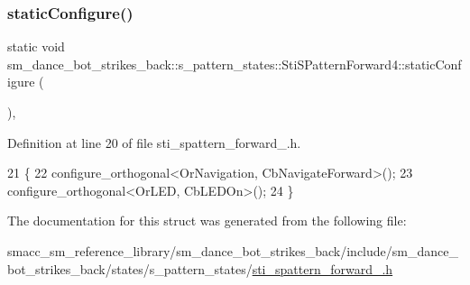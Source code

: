 \subsubsection{\texorpdfstring{static\+Configure()}{staticConfigure()}}
{\footnotesize\ttfamily static void sm\+\_\+dance\+\_\+bot\+\_\+strikes\+\_\+back\+::s\+\_\+pattern\+\_\+states\+::\+Sti\+S\+Pattern\+Forward4\+::static\+Configure (\begin{DoxyParamCaption}{ }\end{DoxyParamCaption})\hspace{0.3cm}{\ttfamily [inline]}, {\ttfamily [static]}}



Definition at line 20 of file sti\+\_\+spattern\+\_\+forward\+\_.\+h.


\begin{DoxyCode}
21   \{
22     configure\_orthogonal<OrNavigation, CbNavigateForward>();
23     configure\_orthogonal<OrLED, CbLEDOn>();
24   \}
\end{DoxyCode}


The documentation for this struct was generated from the following file\+:\begin{DoxyCompactItemize}
\item 
smacc\+\_\+sm\+\_\+reference\+\_\+library/sm\+\_\+dance\+\_\+bot\+\_\+strikes\+\_\+back/include/sm\+\_\+dance\+\_\+bot\+\_\+strikes\+\_\+back/states/s\+\_\+pattern\+\_\+states/\hyperlink{strikes__back_2include_2sm__dance__bot__strikes__back_2states_2s__pattern__states_2sti__spattern__forward__4_8h}{sti\+\_\+spattern\+\_\+forward\+\_.\+h}\end{DoxyCompactItemize}
